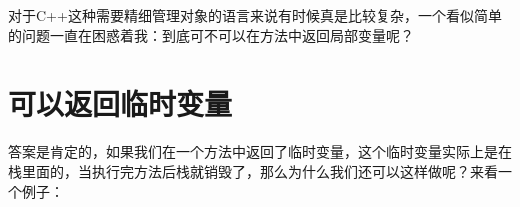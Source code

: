 \documentclass[12pt]{article}
\begin{document}
\makeblogtitle

对于C++这种需要精细管理对象的语言来说有时候真是比较复杂，一个看似简单的问题一直在困惑着我：到底可不可以在方法中返回局部变量呢？

\section{可以返回临时变量}\label{ux53efux4ee5ux8fd4ux56deux4e34ux65f6ux53d8ux91cf}

答案是肯定的，如果我们在一个方法中返回了临时变量，这个临时变量实际上是在栈里面的，当执行完方法后栈就销毁了，那么为什么我们还可以这样做呢？来看一个例子：

\begin{Shaded}
\begin{Highlighting}[]
 \OperatorTok{;}

\OperatorTok{\{}
    \OperatorTok{:}
\OperatorTok{(}\OperatorTok{):}\OperatorTok{(}\OperatorTok{)} \OperatorTok{\{} \OperatorTok{\textless{}\textless{}}  \OperatorTok{\textless{}\textless{}}\OperatorTok{\textless{}\textless{}} \OperatorTok{;} \OperatorTok{\}}
\OperatorTok{(}\OperatorTok{\&}\OperatorTok{)} \OperatorTok{\{} 
            \OperatorTok{\textless{}\textless{}}  \OperatorTok{\textless{}\textless{}}\OperatorTok{\textless{}\textless{}} \OperatorTok{;} 
            \OperatorTok{{-}\textgreater{}}\OperatorTok{=}\OperatorTok{;}
        \OperatorTok{\}}
        \OperatorTok{\textasciitilde{}}\OperatorTok{()} \OperatorTok{\{} \OperatorTok{\textless{}\textless{}}  \OperatorTok{\textless{}\textless{}}\OperatorTok{\textless{}\textless{}} \OperatorTok{;} \OperatorTok{\}}
        \OperatorTok{()} \OperatorTok{\{} \OperatorTok{\textless{}\textless{}}  \OperatorTok{\textless{}\textless{}}\OperatorTok{\textless{}\textless{}} \OperatorTok{;} \OperatorTok{\}}
    \OperatorTok{:}
        \OperatorTok{;}
\OperatorTok{\};}


\end{Highlighting}
\end{Shaded}
\end{document}
